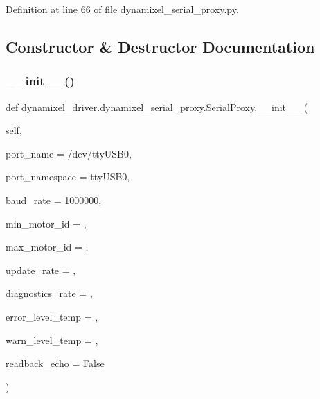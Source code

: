 Definition at line 66 of file dynamixel\+\_\+serial\+\_\+proxy.\+py.



\subsection{Constructor \& Destructor Documentation}
\mbox{\label{classdynamixel__driver_1_1dynamixel__serial__proxy_1_1_serial_proxy_a903847536e561977c91725b98ceec1ee}} 
\subsubsection{\texorpdfstring{\+\_\+\+\_\+init\+\_\+\+\_\+()}{\_\_init\_\_()}}
{\footnotesize\ttfamily def dynamixel\+\_\+driver.\+dynamixel\+\_\+serial\+\_\+proxy.\+Serial\+Proxy.\+\_\+\+\_\+init\+\_\+\+\_\+ (\begin{DoxyParamCaption}\item[{}]{self,  }\item[{}]{port\+\_\+name = {\ttfamily \textquotesingle{}/dev/ttyUSB0\textquotesingle{}},  }\item[{}]{port\+\_\+namespace = {\ttfamily \textquotesingle{}ttyUSB0\textquotesingle{}},  }\item[{}]{baud\+\_\+rate = {\ttfamily \textquotesingle{}1000000\textquotesingle{}},  }\item[{}]{min\+\_\+motor\+\_\+id = {},  }\item[{}]{max\+\_\+motor\+\_\+id = {},  }\item[{}]{update\+\_\+rate = {},  }\item[{}]{diagnostics\+\_\+rate = {},  }\item[{}]{error\+\_\+level\+\_\+temp = {},  }\item[{}]{warn\+\_\+level\+\_\+temp = {},  }\item[{}]{readback\+\_\+echo = {\ttfamily False} }\end{DoxyParamCaption})}



